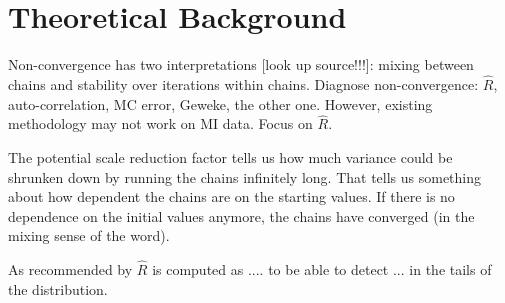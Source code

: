 \documentclass[article]{jss}
\begin{document}

% 
% 

\section{Theoretical Background} \label{sec:background}

Non-convergence has two interpretations [look up source!!!]: mixing between chains and stability over iterations within chains. Diagnose non-convergence: $\widehat{R}$, auto-correlation, MC error, Geweke, the other one. However, existing methodology may not work on MI data. Focus on $\widehat{R}$.

The potential scale reduction factor tells us how much variance could be shrunken down by running the chains infinitely long. That tells us something about how dependent the chains are on the starting values. If there is no dependence on the initial values anymore, the chains have converged (in the mixing sense of the word).

As recommended by \cite{veth19} $\widehat{R}$ is computed as .... to be able to detect ... in the tails of the distribution.
\end{document}
